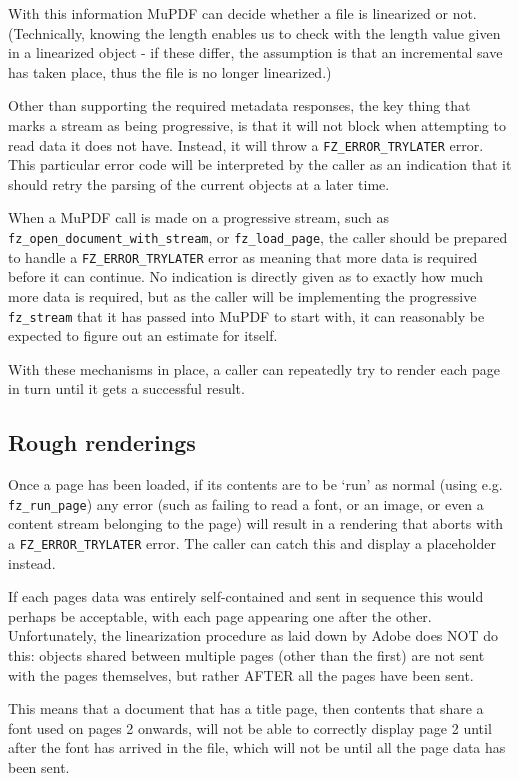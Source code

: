 \documentclass[oneside]{book}
\begin{document}
With this information MuPDF can decide whether a file is linearized or not. (Technically, knowing the length enables us to check with the length value given in a linearized object - if these differ, the assumption is that an incremental save has taken place, thus the file is no longer linearized.)

Other than supporting the required metadata responses, the key thing that marks a stream as being progressive, is that it will not block when attempting to read data it does not have. Instead, it will throw a \texttt{FZ\_ERROR\_TRYLATER} error. This particular error code will be interpreted by the caller as an indication that it should retry the parsing of the current objects at a later time.

When a MuPDF call is made on a progressive stream, such as \texttt{fz\_open\_document\_with\_stream}, or \texttt{fz\_load\_page}, the caller should be prepared to handle a \texttt{FZ\_ERROR\_TRYLATER} error as meaning that more data is required before it can continue. No indication is directly given as to exactly how much more data is required, but as the caller will be implementing the progressive \texttt{fz\_stream} that it has passed into MuPDF to start with, it can reasonably be expected to figure out an estimate for itself.

With these mechanisms in place, a caller can repeatedly try to render each page in turn until it gets a successful result.

\subsection{Rough renderings}

Once a page has been loaded, if its contents are to be `run' as normal (using e.g. \texttt{fz\_run\_page}) any error (such as failing to read a font, or an image, or even a content stream belonging to the page) will result in a rendering that aborts with a \texttt{FZ\_ERROR\_TRYLATER} error. The caller can catch this and display a placeholder instead.

If each pages data was entirely self-contained and sent in sequence this would perhaps be acceptable, with each page appearing one after the other. Unfortunately, the linearization procedure as laid down by Adobe does NOT do this: objects shared between multiple pages (other than the first) are not sent with the pages themselves, but rather AFTER all the pages have been sent.

This means that a document that has a title page, then contents that share a font used on pages 2 onwards, will not be able to correctly display page 2 until after the font has arrived in the file, which will not be until all the page data has been sent.
\end{document}
